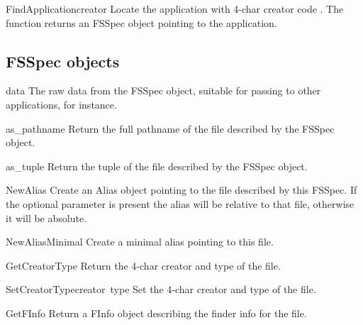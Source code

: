 \begin{funcdesc}{FindApplication}{creator}
Locate the application with 4-char creator code . The
function returns an FSSpec object pointing to the application.
\end{funcdesc}

\subsection{FSSpec objects}

\renewcommand{\indexsubitem}{(FSSpec object attribute)}
\begin{datadesc}{data}
The raw data from the FSSpec object, suitable for passing
to other applications, for instance.
\end{datadesc}

\renewcommand{\indexsubitem}{(FSSpec object method)}
\begin{funcdesc}{as_pathname}{}
Return the full pathname of the file described by the FSSpec object.
\end{funcdesc}

\begin{funcdesc}{as_tuple}{}
Return the  tuple of the file described
by the FSSpec object.
\end{funcdesc}

\begin{funcdesc}{NewAlias}{}
Create an Alias object pointing to the file described by this
FSSpec. If the optional  parameter is present the alias
will be relative to that file, otherwise it will be absolute.
\end{funcdesc}

\begin{funcdesc}{NewAliasMinimal}{}
Create a minimal alias pointing to this file.
\end{funcdesc}

\begin{funcdesc}{GetCreatorType}{}
Return the 4-char creator and type of the file.
\end{funcdesc}

\begin{funcdesc}{SetCreatorType}{creator\, type}
Set the 4-char creator and type of the file.
\end{funcdesc}

\begin{funcdesc}{GetFInfo}{}
Return a FInfo object describing the finder info for the file.
\end{funcdesc}

